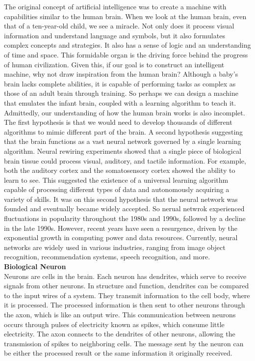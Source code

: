 \documentclass{article}
\begin{document}
    The original concept of artificial intelligence was to create a machine with capabilities similar to the human brain. When we look at the human brain, even that of a ten-year-old child, we see a miracle. Not only does it process visual information and understand language and symbols, but it also formulates complex concepts and strategies. It also has a sense of logic and an understanding of time and space. This formidable organ is the driving force behind the progress of human civilization. Given this, if our goal is to construct an intelligent machine, why not draw inspiration from the human brain? Although a baby's brain lacks complete abilities, it is capable of performing tasks as complex as those of an adult brain through training. So perhaps we can design a machine that emulates the infant brain, coupled with a learning algorithm to teach it. Admittedly, our understanding of how the human brain works is also incomplet. The first hypothesis is that we would need to develop thousands of different algorithms to mimic different part of the brain. A second hypothesis suggesting that the brain functions as a vast neural network governed by a single learning algorithm. Neural rewiring experiments showed that a single piece of biological brain tissue could process visual, auditory, and tactile information. For example, both the auditory cortex and the somatosensory cortex showed the ability to learn to see. This suggested the existence of a universal learning algorithm capable of processing different types of data and autonomously acquiring a variety of skills. It was on this second hypothesis that the neural network was founded and eventually became widely accepted. So nerual netwrok experienced fluctuations in popularity throughout the 1980s and 1990s, followed by a decline in the late 1990s. However, recent years have seen a resurgence, driven by the exponential growth in computing power and data resources. Currently, neural networks are widely used in various industries, ranging from image object recognition, recommendation systems, speech recognition, and more.\\


    \textbf{Biological Neuron}\\
    Neurons are cells in the brain. Each neuron has dendrites, which serve to receive signals from other neurons. In structure and function, dendrites can be compared to the input wires of a system. They transmit information to the cell body, where it is processed. The processed information is then sent to other neurons through the axon, which is like an output wire. This communication between neurons occurs through pulses of electricity known as spikes, which consume little electricity. The axon connects to the dendrites of other neurons, allowing the transmission of spikes to neighboring cells. The message sent by the neuron can be either the processed result or the same information it originally received.
\end{document}
